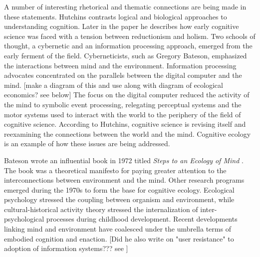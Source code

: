 A number of interesting rhetorical and thematic connections are being made in these statements. Hutchins contrasts logical and biological approaches to understanding cognition. Later in the paper he describes how early cognitive science was faced with a tension between reductionism and holism. Two schools of thought, a cybernetic and an information processing approach, emerged from the early ferment of the field. Cyberneticists, such as Gregory Bateson, emphasized the interactions between mind and the environment. Information processing advocates concentrated on the parallels between the digital computer and the mind. [make a diagram of this and use along with diagram of ecological economics? see below] The focus on the digital computer reduced the activity of the mind to symbolic event processing, relegating perceptual systems and the motor systems used to interact with the world to the periphery of the field of cognitive science. According to Hutchins, cognitive science is revising itself and reexamining the connections between the world and the mind. Cognitive ecology is an example of how these issues are being addressed.

Bateson wrote an influential book in 1972 titled \textit{Steps to an Ecology of Mind} \citep{bateson_1972}. The book was a theoretical manifesto for paying greater attention to the interconnections between environment and the mind. Other research programs emerged during the 1970s to form the base for cognitive ecology. Ecological psychology stressed the coupling between organism and environment, while cultural-historical activity theory stressed the internalization of inter-psychological processes during childhood development. Recent developments linking mind and environment have coalesced under the umbrella terms of embodied cognition and enaction. [Did he also write on "user resistance" to adoption of information systems??? see \citep{star_1996}]

